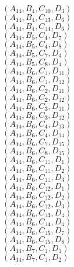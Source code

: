 \documentclass[14pt]{article}
\begin{document}
    $({A}_{14}, {B}_{4}, {C}_{10}, {D}_{3}) $ \\ 
    $({A}_{14}, {B}_{4}, {C}_{13}, {D}_{6}) $ \\ 
    $({A}_{14}, {B}_{4}, {C}_{14}, {D}_{6}) $ \\ 
    $({A}_{14}, {B}_{5}, {C}_{4}, {D}_{7}) $ \\ 
    $({A}_{14}, {B}_{5}, {C}_{4}, {D}_{8}) $ \\ 
    $({A}_{14}, {B}_{5}, {C}_{7}, {D}_{4}) $ \\ 
    $({A}_{14}, {B}_{5}, {C}_{8}, {D}_{4}) $ \\ 
    $({A}_{14}, {B}_{6}, {C}_{1}, {D}_{11}) $ \\ 
    $({A}_{14}, {B}_{6}, {C}_{1}, {D}_{12}) $ \\ 
    $({A}_{14}, {B}_{6}, {C}_{2}, {D}_{11}) $ \\ 
    $({A}_{14}, {B}_{6}, {C}_{2}, {D}_{12}) $ \\ 
    $({A}_{14}, {B}_{6}, {C}_{3}, {D}_{11}) $ \\ 
    $({A}_{14}, {B}_{6}, {C}_{3}, {D}_{12}) $ \\ 
    $({A}_{14}, {B}_{6}, {C}_{4}, {D}_{13}) $ \\ 
    $({A}_{14}, {B}_{6}, {C}_{4}, {D}_{14}) $ \\ 
    $({A}_{14}, {B}_{6}, {C}_{7}, {D}_{15}) $ \\ 
    $({A}_{14}, {B}_{6}, {C}_{8}, {D}_{15}) $ \\ 
    $({A}_{14}, {B}_{6}, {C}_{11}, {D}_{1}) $ \\ 
    $({A}_{14}, {B}_{6}, {C}_{11}, {D}_{2}) $ \\ 
    $({A}_{14}, {B}_{6}, {C}_{11}, {D}_{3}) $ \\ 
    $({A}_{14}, {B}_{6}, {C}_{12}, {D}_{1}) $ \\ 
    $({A}_{14}, {B}_{6}, {C}_{12}, {D}_{2}) $ \\ 
    $({A}_{14}, {B}_{6}, {C}_{12}, {D}_{3}) $ \\ 
    $({A}_{14}, {B}_{6}, {C}_{13}, {D}_{4}) $ \\ 
    $({A}_{14}, {B}_{6}, {C}_{14}, {D}_{4}) $ \\ 
    $({A}_{14}, {B}_{6}, {C}_{15}, {D}_{7}) $ \\ 
    $({A}_{14}, {B}_{6}, {C}_{15}, {D}_{8}) $ \\ 
    $({A}_{14}, {B}_{7}, {C}_{1}, {D}_{1}) $ \\ 
    $({A}_{14}, {B}_{7}, {C}_{1}, {D}_{2}) $ \\ 
\end{document}
